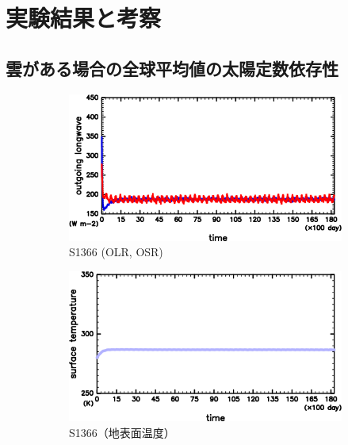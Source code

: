 \documentclass[body]{subfiles}
\begin{document}
\chapter{実験結果と考察}\label{result}

\section{雲がある場合の全球平均値の太陽定数依存性}

\begin{figure}[t]
	\centering
	\begin{subfigure}{.4\textwidth}
		\centering
		\includegraphics[width=\textwidth]{S1366/S1366_OLRA-OSRA_horimean_time0.0-18250.0-crop.png}
		\caption{S1366 (OLR, OSR)}\label{S1366_OLRA}
	\end{subfigure}
	\begin{subfigure}{.4\textwidth}
		\centering
		\includegraphics[width=\textwidth]{S1366/S1366_SurfTemp_horimean_time0.0-18250.0-crop.png}
		\caption{S1366（地表面温度）}\label{S1366_SurfTemp}
	\end{subfigure}
	\begin{subfigure}{.4\textwidth}

\end{subfigure}
\end{figure}
\end{document}
